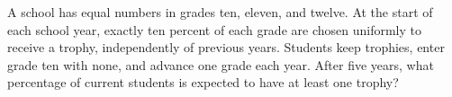 A school has equal numbers in grades ten, eleven, and twelve. At the start of each school year, exactly ten percent of each grade are chosen uniformly to receive a trophy, independently of previous years. Students keep trophies, enter grade ten with none, and advance one grade each year. After five years, what percentage of current students is expected to have at least one trophy?
